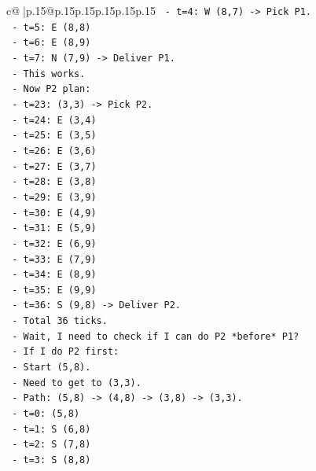 \documentclass{article}
\begin{document}
{\begin{supertabular}{c@{$\;$}|p{.15\linewidth}@{}p{.15\linewidth}p{.15\linewidth}p{.15\linewidth}p{.15\linewidth}p{.15\linewidth}}
{{{\texttt{            {-}   t=4: W (8,7) {-}> Pick P1.} \\
\texttt{            {-}   t=5: E (8,8)} \\
\texttt{            {-}   t=6: E (8,9)} \\
\texttt{            {-}   t=7: N (7,9) {-}> Deliver P1.} \\
\texttt{            {-}   This works.} \\
\texttt{            {-}   Now P2 plan:} \\
\texttt{            {-}   t=23: (3,3) {-}> Pick P2.} \\
\texttt{            {-}   t=24: E (3,4)} \\
\texttt{            {-}   t=25: E (3,5)} \\
\texttt{            {-}   t=26: E (3,6)} \\
\texttt{            {-}   t=27: E (3,7)} \\
\texttt{            {-}   t=28: E (3,8)} \\
\texttt{            {-}   t=29: E (3,9)} \\
\texttt{            {-}   t=30: E (4,9)} \\
\texttt{            {-}   t=31: E (5,9)} \\
\texttt{            {-}   t=32: E (6,9)} \\
\texttt{            {-}   t=33: E (7,9)} \\
\texttt{            {-}   t=34: E (8,9)} \\
\texttt{            {-}   t=35: E (9,9)} \\
\texttt{            {-}   t=36: S (9,8) {-}> Deliver P2.} \\
\texttt{            {-}   Total 36 ticks.} \\
\texttt{            {-}   Wait, I need to check if I can do P2 *before* P1?} \\
\texttt{            {-}   If I do P2 first:} \\
\texttt{                {-}   Start (5,8).} \\
\texttt{                {-}   Need to get to (3,3).} \\
\texttt{                {-}   Path: (5,8) {-}> (4,8) {-}> (3,8) {-}> (3,3).} \\
\texttt{                {-}   t=0: (5,8)} \\
\texttt{                {-}   t=1: S (6,8)} \\
\texttt{                {-}   t=2: S (7,8)} \\
\texttt{                {-}   t=3: S (8,8)} \\
}}}
\end{supertabular}}
\end{document}
